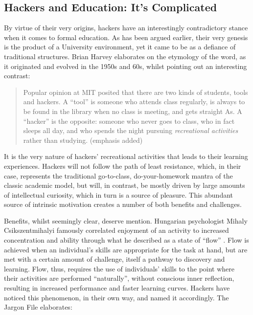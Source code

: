 \subsection{Hackers and Education: It's Complicated}

By virtue of their very origins, hackers have an interestingly contradictory stance when it comes to formal education. As has been argued earlier, their very genesis is the product of a University environment, yet it came to be as a defiance of traditional structures. Brian Harvey \citeyearpar{harvey86} elaborates on the etymology of the word, as it originated and evolved in the 1950s and 60s, whilst pointing out an interesting contrast:

\begin{quote}
Popular opinion at MIT posited that there are two kinds of students, tools and hackers. A ``tool'' is someone who attends class regularly, is always to be found in the library when no class is meeting, and gets straight As. A ``hacker'' is the opposite: someone who never goes to class, who in fact sleeps all day, and who spends the night pursuing \emph{recreational activities} rather than studying. (emphasis added)
\end{quote}

It is the very nature of hackers' recreational activities that leads to their learning experiences. Hackers will not follow the path of least resistance, which, in their case, represents the traditional go-to-class, do-your-home\-work mantra of the classic academic model, but will, in contrast, be mostly driven by large amounts of intellectual curiosity, which in turn is a source of pleasure. This abundant source of intrinsic motivation creates a number of both benefits and challenges.

Benefits, whilst seemingly clear, deserve mention. Hungarian psychologist Mihaly Csikszentmihalyi famously correlated enjoyment of an activity to increased concentration and ability through what he described as a state of ``flow'' \citep{csikszentmihalyi75}. Flow is achieved when an individual's skills are appropriate for the task at hand, but are met with a certain amount of challenge, itself a pathway to discovery and learning. Flow, thus, requires the use of individuals' skills to the point where their activities are performed ``naturally'', without conscious inner reflection, resulting in increased performance and faster learning curves. Hackers have noticed this phenomenon, in their own way, and named it accordingly. The Jargon File elaborates:

